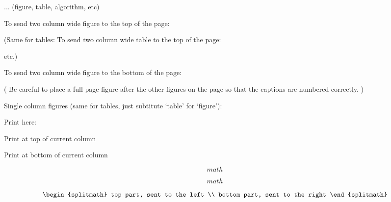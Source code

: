 \spanbothcolumns[h]
   ... (figure, table, algorithm, etc)
\endspanbothcolumns

To send two column wide figure to the top of the page:
\spanbothcolumns
\begin{figure}[t]
\caption{ }
\end{figure}
\endspanbothcolumns

(Same for tables:
To send two column wide table to the top of the page:
\spanbothcolumns
\begin{table}[t]
\caption{ }
\end{table}
\endspanbothcolumns
etc.)

To send two column wide figure to the bottom of the page:
\spanbothcolumns
\begin{figure}[b]
\caption{ }
\end{figure}
\endspanbothcolumns

( Be careful to place a full page figure  after the other
  figures on the page so that the captions are numbered correctly. )
\spanbothcolumns
\begin{figure}[p]
\caption{ }
\end{figure}
\endspanbothcolumns

Single column figures (same for tables, just subtitute `table' for `figure'):

Print here:
\begin{figure}[h]
\caption{}
\end{figure}

Print at top of current column
\begin{figure}[t]
\caption{}
\end{figure}

Print at bottom of current column
\begin{figure}[b]
\caption{}
\end{figure}



\begin{equation}
math
\end{equation}

\begin{wideequation}
\begin{equation}
math
\end{equation}
\end{wideequation}


\[
\begin{splitmath}
top part, sent to the left
\\
bottom part, sent to the right
\end{splitmath}
\]

